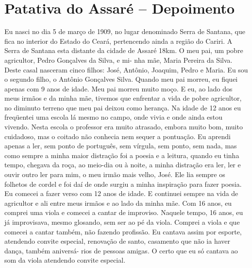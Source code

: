 \chapter{Patativa do Assaré -- Depoimento}

Eu nasci no dia 5 de março de 1909, no lugar denominado Serra de
Santana, que fica no interior do Estado do Ceará, pertencendo ainda a
região do Cariri. A Serra de Santana esta distante da cidade de Assaré
18km. O meu pai, um pobre agricultor, Pedro Gonçalves da Silva, e mi-
nha mãe, Maria Pereira da Silva. Deste casal nasceram cinco filhos:
José, Antônio, Joaquim, Pedro e Maria. Eu sou o segundo filho, o
Antônio Gonçalves Silva. Quando meu pai morreu, eu fiquei apenas com 9
anos de idade. Meu pai morreu muito moço. E eu, ao lado dos meus irmãos
e da minha mãe, tivemos que enfrentar a vida de pobre agricultor, no
diminuto terreno que meu pai deixou como herança. Na idade de 12 anos
eu freqüentei uma escola lá mesmo no campo, onde vivia e onde ainda
estou vivendo. Nesta escola o professor era muito atrasado, embora muito
bom, muito cuidadoso, mas o coitado não conhecia nem sequer a pontuação.
Eu aprendi apenas a ler, sem ponto de português, sem vírgula, sem ponto,
sem nada, mas como sempre a minha maior distração foi a poesia e a
leitura, quando eu tinha tempo, chegava da roça, ao meio-dia ou à noite,
a minha distração era ler, ler e ouvir outro ler para mim, o meu irmão
mais velho, José. Ele lia sempre os folhetos de cordel e foi daí de
onde surgiu a minha inspiração para fazer poesia. Eu comecei a fazer
verso com 12 anos de idade. E continuei sempre na vida de agricultor e
ali entre meus irmãos e ao lado da minha mãe. Com 16 anos, eu comprei
uma viola e comecei a cantar de improviso. Naquele tempo, 16 anos, eu já improvisava, mesmo glosando, sem ser ao pé
da viola. Comprei a viola e que comecei a cantar também, não fazendo
profissão. Eu cantava assim por esporte, atendendo convite especial,
renovação de santo, casamento que não ia haver dança, também aniversá-
rios de pessoas amigas. O certo que eu só cantava ao som da viola
atendendo convite especial.


